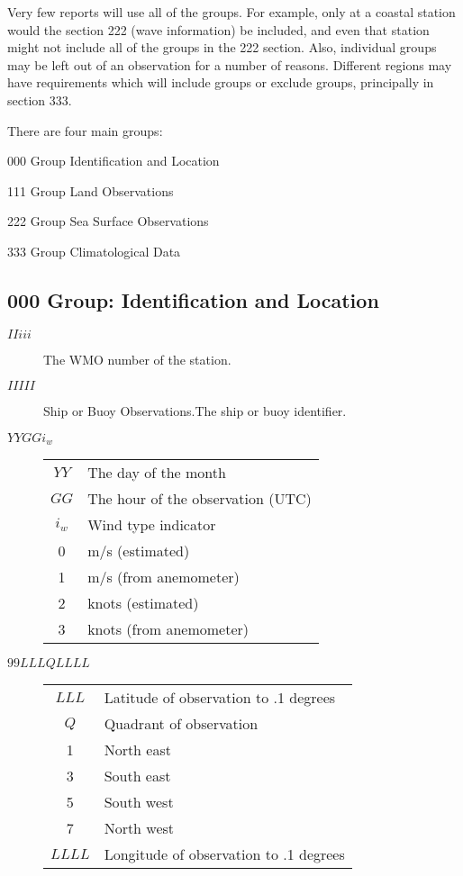 \documentclass{article}
\begin{document}
Very few reports will use all of the groups. For example, only at a coastal station would the section 222 (wave
information) be included, and even that station might not include all of the groups in the 222
section. Also, individual groups may be left out of an observation for a number of reasons.
Different regions may have requirements which will include groups or exclude groups,
principally in section 333.


There are four main groups:

\begin{description}
\item{000 Group} Identification and Location
\item{111 Group} Land Observations
\item{222 Group} Sea Surface Observations
\item{333 Group} Climatological Data
\end{description}

\subsection{000 Group: Identification and Location}

\begin{description}
\item[$IIiii$] The WMO number of the station.
\item[$IIIII$] Ship or Buoy Observations.The ship or buoy identifier.
\item[$YYGGi_w$]
  \begin{tabular}{cl}
    $YY$ & The day of the month\\
    $GG$ & The hour of the observation (UTC)\\
    $i_w$ & Wind type indicator\\
    0  & m/s (estimated)\\
    1  & m/s (from anemometer)\\
    2  & knots (estimated)\\
    3  & knots (from anemometer)
  \end{tabular}
\item[$99LLL QLLLL$]
  \begin{tabular}{cl}
    $LLL$ & Latitude of observation to .1 degrees\\
    $Q$ & Quadrant of observation\\
    1 & North east \\
    3 & South east\\
    5 & South west\\
    7 & North west\\
    $LLLL$ & Longitude of  observation to .1 degrees
  \end{tabular}
\end{description}
\end{document}
